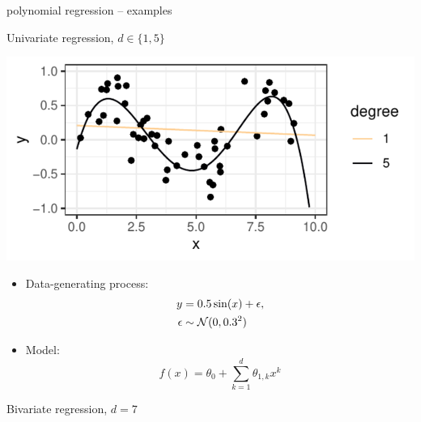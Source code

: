 \documentclass[11pt,compress,t,notes=noshow, xcolor=table]{beamer}
\begin{document}
\begin{frame}{polynomial regression -- examples}

Univariate regression, $d \in \{1, 5\}$

\begin{minipage}[c]{0.5\textwidth}
  \includegraphics[width=\textwidth]{figure/reg_poly_univ_2}
\end{minipage}
\begin{minipage}[c]{0.45\textwidth}
  \begin{itemize}
    \footnotesize
    \item
    Data-generating process: 
    \begin{align*}
      y &= 0.5 \sin(x) + \epsilon, \\
      \epsilon &\sim \mathcal{N}(0, 0.3^2)
    \end{align*}
    \item Model: $$f(x) = \theta_0 + \sum_{k = 1}^d \theta_{1, k} x^k$$
  \end{itemize}
\end{minipage}

\vfill

Bivariate regression, $d = 7$


\end{frame}
\end{document}

